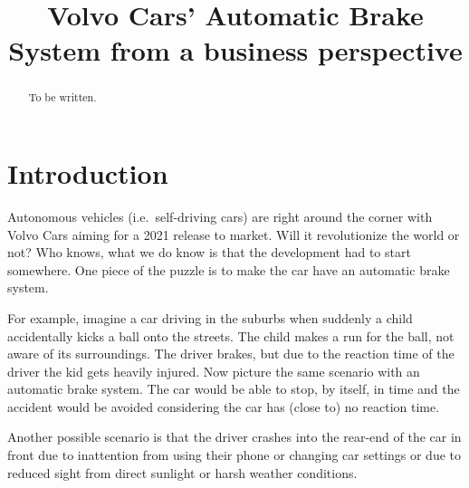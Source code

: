 \documentclass[conference]{IEEEtran}
\begin{document}
\title{Volvo Cars' Automatic Brake System from a business perspective}

\author{
\and
{}
}

\maketitle

\begin{abstract}
To be written.
\end{abstract}


\section{Introduction}
Autonomous vehicles (i.e.\ self-driving cars) are right around the corner with Volvo Cars aiming for a 2021 release to market.\cite{ADToMarket} Will it revolutionize the world or not? Who knows, what we do know is that the development had to start somewhere. One piece of the puzzle is to make the car have an automatic brake system. 

For example, imagine a car driving in the suburbs when suddenly a child accidentally kicks a ball onto the streets. The child makes a run for the ball, not aware of its surroundings. The driver brakes, but due to the reaction time of the driver the kid gets heavily injured. Now picture the same scenario with an automatic brake system. The car would be able to stop, by itself, in time and the accident would be avoided considering the car has (close to) no reaction time.

Another possible scenario is that the driver crashes into the rear-end of the car in front due to inattention from using their phone or changing car settings or due to reduced sight from direct sunlight or harsh weather conditions.
\end{document}
